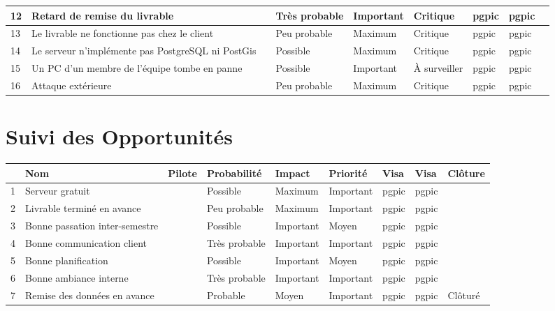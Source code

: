 \documentclass[asi]{picInsa}
\begin{document}
\begin{longtable}{|p{0.3cm}|p{2.5cm}|p{2cm}|p{2cm}|p{1.8cm}|p{1.5cm}|p{1cm}|p{1cm}|p{1.5cm}|}
			 12 & Retard de remise du livrable & \Kafui & Très probable & Important & Critique & pgpic & pgpic & \\\hline
			 
			 13 & Le livrable ne fonctionne pas chez le client & \Melissa & Peu probable & Maximum & Critique & pgpic & pgpic & \\\hline
			 
			 14 & Le serveur n’implémente pas PostgreSQL ni PostGis & \Sergi & Possible & Maximum & Critique & pgpic & pgpic & \\\hline
			 
			 15 & Un PC d'un membre de l'équipe tombe en panne & \Sergi & Possible & Important & À surveiller & pgpic & pgpic & \\\hline

			 16 & Attaque extérieure & \Florian & Peu probable & Maximum & Critique & pgpic & pgpic & \\\hline
			 
			 
\end{longtable}

\chapter*{Suivi des Opportunités}

\begin{longtable}{|p{0.3cm}|p{2.5cm}|p{2cm}|p{2cm}|p{1.8cm}|p{1.8cm}|p{1cm}|p{1cm}|p{1.5cm}|}
			\hline
			\rowcolor{gray!40}
			\No & Nom & Pilote & Probabilité & Impact & Priorité & Visa \RQCourt{} & Visa \CPCourt{} & Clôture \\\hline
			 1 & Serveur gratuit & \Matthieu & Possible & Maximum & Important & pgpic & pgpic & \\\hline
			 2 & Livrable terminé en avance & \Kafui & Peu probable & Maximum & Important & pgpic & pgpic & \\\hline
			 3 & Bonne passation inter-semestre & \Sergi & Possible & Important & Moyen & pgpic & pgpic & \\\hline
			 4 & Bonne communication client & \Florian & Très probable & Important & Important & pgpic & pgpic & \\\hline
			 5 & Bonne planification & \Sergi & Possible & Important & Moyen & pgpic & pgpic & \\\hline
			 6 & Bonne ambiance interne & \Michel & Très probable & Important & Important & pgpic & pgpic & \\\hline
			 7 & Remise des données en avance & \Sergi & Probable & Moyen & Important & pgpic & pgpic & Clôturé \\\hline
\end{longtable}
\end{document}

